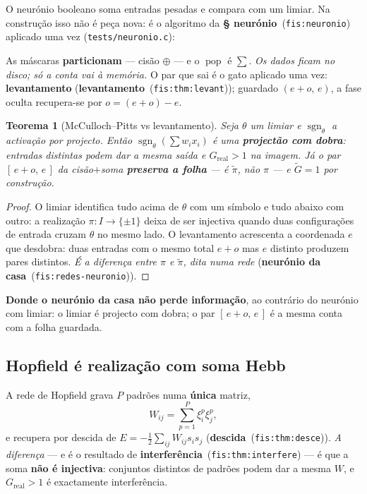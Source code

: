 \documentclass[11pt,a4paper]{article}
\newcommand{\code}[1]{\texttt{\small #1}}
\newcommand{\caixa}[1]{%
  \par\smallskip\noindent
  \begin{center}
  \fbox{\begin{minipage}{0.94\textwidth}\centering\smallskip #1\smallskip\end{minipage}}
  \end{center}\smallskip}
\newcommand{\fis}[2]{\textbf{#2}~\textnormal{(\code{#1})}}
\newtheorem{teorema}{Teorema}
\begin{document}
\noindent O neurónio booleano soma entradas pesadas e compara com um limiar. Na
construção isso não é peça nova: é o algoritmo da \fis{fis:neuronio}{§ neurónio}
aplicado uma vez (\code{tests/neuronio.c}):
\caixa{%
  $e=\operatorname{pop}(b\wedge\mathtt{0x55}),\quad
  o=\operatorname{pop}(b\wedge\mathtt{0xAA}),\quad
  \text{sai } [\,e{+}o,\ e\,]$%
}
As máscaras \textbf{particionam} --- cisão $\oplus$ --- e o $\operatorname{pop}$ é
$\sum$. \emph{Os dados ficam no disco; só a conta vai à memória.} O par que sai é o
gato aplicado uma vez: \textbf{levantamento} (\fis{fis:thm:levant}{levantamento});
guardado $(e{+}o,\,e)$, a fase oculta recupera-se por $o=(e{+}o)-e$.

\begin{teorema}[McCulloch--Pitts vs levantamento]\label{redes:thm-mp}
Seja $\theta$ um limiar e $\operatorname{sgn}_\theta$ a activação por projecto.
Então $\operatorname{sgn}_\theta(\sum w_i x_i)$ é uma \textbf{projectão com dobra}:
entradas distintas podem dar a mesma saída e $G_{\mathrm{real}}>1$ na imagem. Já o
par $[\,e{+}o,\,e\,]$ da cisão$+$soma \textbf{preserva a folha} --- é
$\tilde\pi$, não $\pi$ --- e $\tilde G=1$ por construção.
\end{teorema}

\begin{proof}
O limiar identifica tudo acima de $\theta$ com um símbolo e tudo abaixo com outro:
a realização $\pi\colon I\to\{\pm1\}$ deixa de ser injectiva quando duas configurações
de entrada cruzam $\theta$ no mesmo lado. O levantamento acrescenta a coordenada $e$
que desdobra: duas entradas com o mesmo total $e{+}o$ mas $e$ distinto produzem pares
distintos. \emph{É a diferença entre $\pi$ e $\tilde\pi$, dita numa rede}
(\fis{fis:redes-neuronio}{neurónio da casa}).
\end{proof}

\medskip\noindent\textbf{Donde o neurónio da casa não perde informação}, ao
contrário do neurónio com limiar: o limiar é projecto com dobra; o par
$[\,e{+}o,\,e\,]$ é a mesma conta com a folha guardada.

\subsection{Hopfield é realização com soma Hebb}

\noindent A rede de Hopfield grava $P$ padrões numa \textbf{única} matriz,
\[
W_{ij}=\sum_{p=1}^{P}\xi_i^{p}\xi_j^{p},
\]
e recupera por descida de $E=-\tfrac12\sum_{ij}W_{ij}s_is_j$
(\fis{fis:thm:desce}{descida}). \emph{A diferença} --- e é o resultado de
\fis{fis:thm:interfere}{interferência} --- é que a soma \textbf{não é injectiva}:
conjuntos distintos de padrões podem dar a mesma $W$, e $G_{\mathrm{real}}>1$ é
exactamente interferência.
\end{document}
